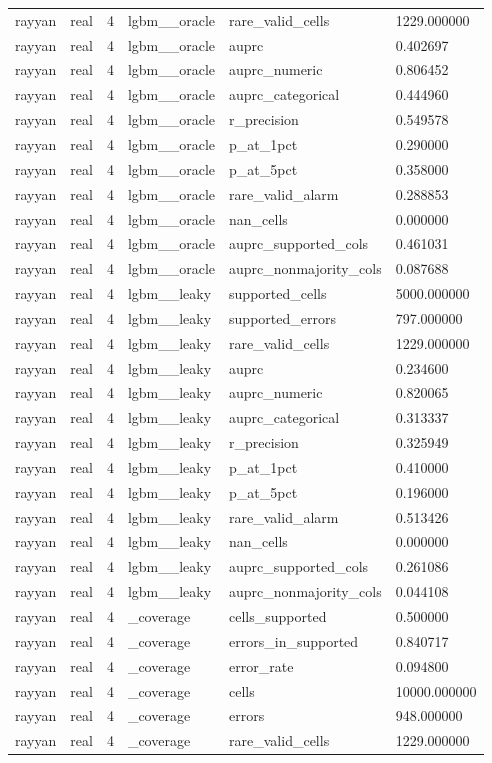 \begin{tabular}{llllll}
rayyan & real & 4 & lgbm\_\_oracle & rare\_valid\_cells & 1229.000000 \\
rayyan & real & 4 & lgbm\_\_oracle & auprc & 0.402697 \\
rayyan & real & 4 & lgbm\_\_oracle & auprc\_numeric & 0.806452 \\
rayyan & real & 4 & lgbm\_\_oracle & auprc\_categorical & 0.444960 \\
rayyan & real & 4 & lgbm\_\_oracle & r\_precision & 0.549578 \\
rayyan & real & 4 & lgbm\_\_oracle & p\_at\_1pct & 0.290000 \\
rayyan & real & 4 & lgbm\_\_oracle & p\_at\_5pct & 0.358000 \\
rayyan & real & 4 & lgbm\_\_oracle & rare\_valid\_alarm & 0.288853 \\
rayyan & real & 4 & lgbm\_\_oracle & nan\_cells & 0.000000 \\
rayyan & real & 4 & lgbm\_\_oracle & auprc\_supported\_cols & 0.461031 \\
rayyan & real & 4 & lgbm\_\_oracle & auprc\_nonmajority\_cols & 0.087688 \\
rayyan & real & 4 & lgbm\_\_leaky & supported\_cells & 5000.000000 \\
rayyan & real & 4 & lgbm\_\_leaky & supported\_errors & 797.000000 \\
rayyan & real & 4 & lgbm\_\_leaky & rare\_valid\_cells & 1229.000000 \\
rayyan & real & 4 & lgbm\_\_leaky & auprc & 0.234600 \\
rayyan & real & 4 & lgbm\_\_leaky & auprc\_numeric & 0.820065 \\
rayyan & real & 4 & lgbm\_\_leaky & auprc\_categorical & 0.313337 \\
rayyan & real & 4 & lgbm\_\_leaky & r\_precision & 0.325949 \\
rayyan & real & 4 & lgbm\_\_leaky & p\_at\_1pct & 0.410000 \\
rayyan & real & 4 & lgbm\_\_leaky & p\_at\_5pct & 0.196000 \\
rayyan & real & 4 & lgbm\_\_leaky & rare\_valid\_alarm & 0.513426 \\
rayyan & real & 4 & lgbm\_\_leaky & nan\_cells & 0.000000 \\
rayyan & real & 4 & lgbm\_\_leaky & auprc\_supported\_cols & 0.261086 \\
rayyan & real & 4 & lgbm\_\_leaky & auprc\_nonmajority\_cols & 0.044108 \\
rayyan & real & 4 & \_coverage & cells\_supported & 0.500000 \\
rayyan & real & 4 & \_coverage & errors\_in\_supported & 0.840717 \\
rayyan & real & 4 & \_coverage & error\_rate & 0.094800 \\
rayyan & real & 4 & \_coverage & cells & 10000.000000 \\
rayyan & real & 4 & \_coverage & errors & 948.000000 \\
rayyan & real & 4 & \_coverage & rare\_valid\_cells & 1229.000000 \\
\hline
\end{tabular}
